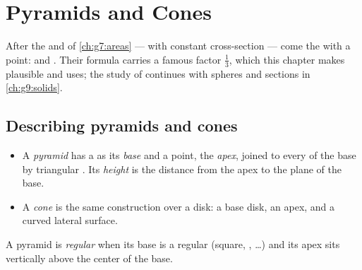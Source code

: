 \chapter{Pyramids and Cones}\label{ch:g8:solids}

After the  and  of \cref{ch:g7:areas} ---  with
constant cross-section --- come the  with a point:  and
. Their  formula carries a famous factor $\frac13$, which
this chapter makes plausible and uses; the study of  continues
with spheres and sections in \cref{ch:g9:solids}.

\section{Describing pyramids and cones}

\begin{definition}\label{def:g8:solids:def}
\begin{itemize}
  \item A \emph{pyramid} has a  as its
        \emph{base} and a point, the \emph{apex}, joined to every
         of the base by triangular . Its \emph{height} is
        the distance from the apex to the plane of the base.
  \item A \emph{cone} is the same construction over a
        disk: a base disk, an apex, and a curved lateral surface.
\end{itemize}
A pyramid is \emph{regular} when its base is a regular 
(square, , \dots) and its apex sits vertically
above the center of the base.
\end{definition}

